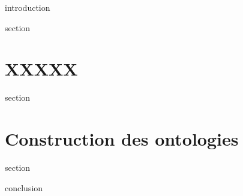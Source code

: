 \chaptertoc{}

\label{sec:5-int}
{introduction}

{section}

\section{XXXXX}
\label{sec:5-1}
{section}

\section{Construction des ontologies}
\label{sec:5-2}
{section}

\label{sec:5-cnc}
{conclusion}


